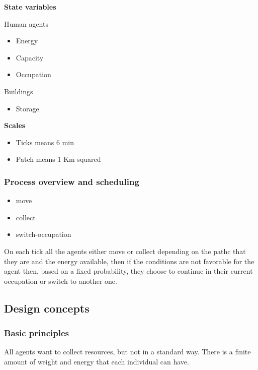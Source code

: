 \documentclass{wscpaperproc}
\theoremstyle{wsc}
\begin{document}
\noindent \textbf{State variables}

Human agents

\begin{itemize}
    \item Energy
    \item Capacity
    \item Occupation
\end{itemize}

Buildings

\begin{itemize}
    \item Storage
\end{itemize}

\noindent \textbf{Scales}

\begin{itemize}
    \item Ticks means 6 min
    \item Patch means 1 Km squared
\end{itemize}

\subsubsection{Process overview and scheduling}

\begin{itemize}
    \item move
    \item collect
    \item switch-occupation
\end{itemize}

On each tick all the agents either move or collect depending on the pathc that
they are and the energy available, then if the conditions are not favorable for
the agent then, based on a fixed probability, they choose to continue in their
current occupation or switch to another one.

\subsection{Design concepts}

\subsubsection{Basic principles}

All agents want to collect resources, but not in a standard way. There is a
finite amount of weight and energy that each individual can have.
\end{document}
